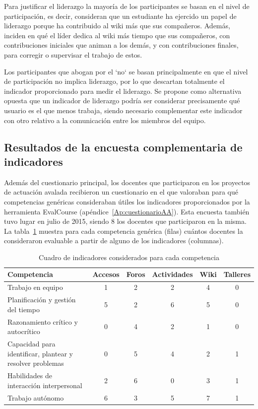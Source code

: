 Para justificar el liderazgo la mayoría de los participantes se basan en el nivel de participación, es decir, consideran que un estudiante ha ejercido un papel de liderazgo porque ha contribuido al wiki más que sus compañeros. Además, inciden en qué el líder dedica al wiki más tiempo que sus compañeros, con contribuciones iniciales que animan a los demás, y con contribuciones finales, para corregir o supervisar el trabajo de estos.

Los participantes que abogan por el `no` se basan principalmente en que el nivel de participación no implica liderazgo, por lo que descartan totalmente el indicador proporcionado para medir el liderazgo. Se propone como alternativa opuesta que un indicador de liderazgo podría ser considerar precisamente qué usuario es el que menos trabaja, siendo necesario complementar este indicador con otro relativo a la comunicación entre los miembros del equipo.

\subsection{Resultados de la encuesta complementaria de indicadores}

Además del cuestionario principal, los docentes que participaron en los proyectos de actuación avalada recibieron un cuestionario en el que valoraban para qué competencias genéricas consideraban útiles los indicadores proporcionados por la herramienta EvalCourse (apéndice~\ref{Ap:cuestionarioAA}). Esta encuesta también tuvo lugar en julio de 2015, siendo 8 los docentes que participaron en la misma. La tabla~\ref{tab:indicador:competencia} muestra para cada competencia genérica (filas) cuántos docentes la consideraron evaluable a partir de alguno de los indicadores (columnas).

\begin{table}
	\centering
	\caption{Cuadro de indicadores considerados para cada competencia}
	\label{tab:indicador:competencia}
	\begin{tabular}{|m{3.8cm}|c|c|c|c|c|}
		\hline
		Competencia & Accesos & Foros & Actividades & Wiki & Talleres \\
		\hline
		\hline
		Trabajo en equipo & 1 & 2 & 2 & 4 & 0  \\
		\hline
		Planificación y gestión del tiempo & 5 & 2 & 6 & 5 & 0  \\
		\hline
		Razonamiento crítico y autocrítico & 0 & 4 & 2 & 1 & 0  \\
		\hline
		Capacidad para identificar, plantear y resolver problemas & 0 & 5 & 4 & 2 & 1 \\
		\hline
		Habilidades de interacción interpersonal & 2 & 6 & 0 & 3 & 1 \\
		\hline
		Trabajo autónomo & 6 & 3 & 5 & 7 & 1 \\
		\hline
	\end{tabular}
\end{table}

